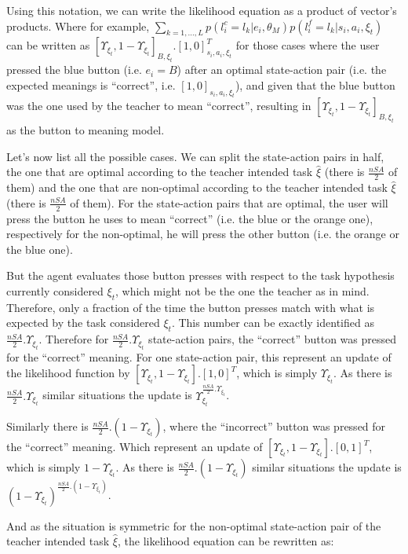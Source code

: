 Using this notation, we can write the likelihood equation as a product of vector's products. Where for example, $\sum_{k = 1, \ldots, L} p(l^c_i = l_k | e_i, \theta_M) p(l^f_i = l_k | s_i, a_i, \xi_t)$ can be written as $[\Upsilon_{\xi_t},1-\Upsilon_{\xi_t}]_{B,\xi_t}.[1,0]_{s_i,a_i,\xi_t}^T$ for those cases where the user pressed the blue button (i.e. $e_i = B$) after an optimal state-action pair (i.e. the expected meanings is ``correct'', i.e. $[1,0]_{s_i,a_i,\xi_t}$), and given that the blue button was the one used by the teacher to mean ``correct'', resulting in $[\Upsilon_{\xi_t},1-\Upsilon_{\xi_t}]_{B,\xi_t}$ as the button to meaning model.

Let's now list all the possible cases. We can split the state-action pairs in half, the one that are optimal according to the teacher intended task $\hat{\xi}$ (there is $\frac{nSA}{2}$ of them) and the one that are non-optimal according to the teacher intended task $\hat{\xi}$ (there is $\frac{nSA}{2}$ of them). For the state-action pairs that are optimal, the user will press the button he uses to mean ``correct'' (i.e. the blue or the orange one), respectively for the non-optimal, he will press the other button (i.e. the orange or the blue one).

But the agent evaluates those button presses with respect to the task hypothesis currently considered $\xi_t$, which might not be the one the teacher as in mind. Therefore, only a fraction of the time the button presses match with what is expected by the task considered $\xi_t$. This number can be exactly identified as $\frac{nSA}{2}.\Upsilon_{\xi_t}$. Therefore for $\frac{nSA}{2}.\Upsilon_{\xi_t}$ state-action pairs, the ``correct'' button was pressed for the ``correct'' meaning. For one state-action pair, this represent an update of the likelihood function by $[\Upsilon_{\xi_t},1-\Upsilon_{\xi_t}].[1,0]^T$, which is simply $\Upsilon_{\xi_t}$. As there is $\frac{nSA}{2}.\Upsilon_{\xi_t}$ similar situations the update is $\Upsilon_{\xi_t}^{\frac{nSA}{2}.\Upsilon_{\xi_t}}$.

Similarly there is $\frac{nSA}{2}.(1-\Upsilon_{\xi_t})$, where the ``incorrect'' button was pressed for the ``correct'' meaning. Which represent an update of $[\Upsilon_{\xi_t},1-\Upsilon_{\xi_t}].[0,1]^T$, which is simply $1-\Upsilon_{\xi_t}$. As there is $\frac{nSA}{2}.(1-\Upsilon_{\xi_t})$ similar situations the update is $(1-\Upsilon_{\xi_t})^{\frac{nSA}{2}.(1-\Upsilon_{\xi_t})}$.

And as the situation is symmetric for the non-optimal state-action pair of the teacher intended task $\hat{\xi}$, the likelihood equation can be rewritten as:


